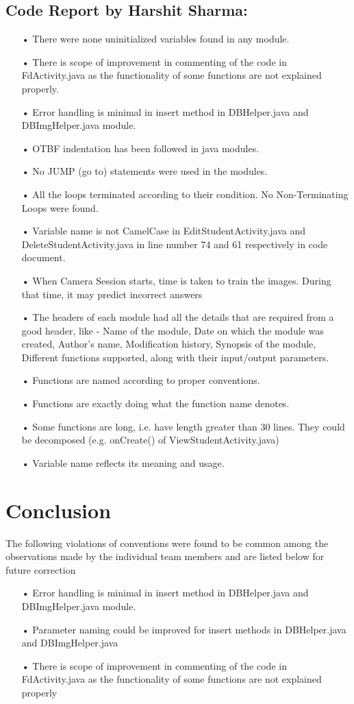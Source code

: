 \documentclass{scrreprt}
\begin{document}
\section{Code Report by Harshit Sharma:}
\begin{itemize}
\item[•] There were none uninitialized variables found in any module.
\item[•] There is scope of improvement in commenting of the code in FdActivity.java as the functionality of
some functions are not explained properly.
\item[•] Error handling is minimal in insert method in DBHelper.java and DBImgHelper.java module.
\item[•] OTBF indentation has been followed in java modules.
\item[•] No JUMP (go to) statements were used in the modules.
\item[•] All the loops terminated according to their condition. No Non-Terminating Loops
were found.
\item[•] Variable name is not CamelCase in EditStudentActivity.java and DeleteStudentActivity.java  in line number 74 and 61 respectively in code document.
\item[•] When Camera Session starts, time is taken to train the images. During that time, it may predict incorrect answers
\item[•] The headers of each module had all the details that are required from a good
header, like - Name of the module, Date on which the module was created, Author’s
name, Modification history, Synopsis of the module, Different functions supported,
along with their input/output parameters.
\item[•] Functions are named according to proper conventions.
\item[•] Functions are exactly doing
what the function name denotes.
\item[•] Some functions are long, i.e. have length greater than 30 lines. They could be decomposed (e.g. onCreate() of ViewStudentActivity.java)
\item[•] Variable name reflects its meaning and usage.
\end{itemize}
\chapter{Conclusion}
The following violations of conventions were found to be
common among the observations made by the individual
team members and are listed below for future correction
\begin{itemize}
\item[•] Error handling is minimal in insert method in DBHelper.java and DBImgHelper.java module.

\item[•] Parameter naming could be improved for insert methods in DBHelper.java and
DBImgHelper.java

\item[•] There is scope of improvement in commenting of the code in FdActivity.java as
the functionality of some functions are not explained properly
\end{itemize}
\end{document}
